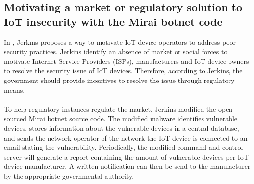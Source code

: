 \documentclass[a4paper,10pt]{article}
\begin{document}
\subsection{Motivating a market or regulatory solution to {IoT} insecurity with the Mirai botnet code} \label{sec:literature_review:Jerkins2017}
In \cite{Jerkins2017}, Jerkins proposes a way to motivate IoT device operators to address poor security practices. Jerkins
identify an absence of market or social forces to motivate Internet Service Providers (ISPs), manufacturers and IoT
device owners to resolve the security issue of IoT devices. Therefore, according to Jerkins, the government should
provide incentives to resolve the issue through regulatory means. 
\\\\
To help regulatory instances regulate the market, Jerkins modified the open sourced Mirai botnet source code. The
modified malware identifies vulnerable devices, stores information about the vulnerable devices in a central database, 
and sends the network operator of the network the IoT device is connected to an email stating the vulnerability.  
Periodically, the modified command and control server will generate a report containing the amount of vulnerable 
devices per IoT device manufacturer. A written notification can then be send to the manufacturer by the appropriate 
governmental authority.

\end{document}

